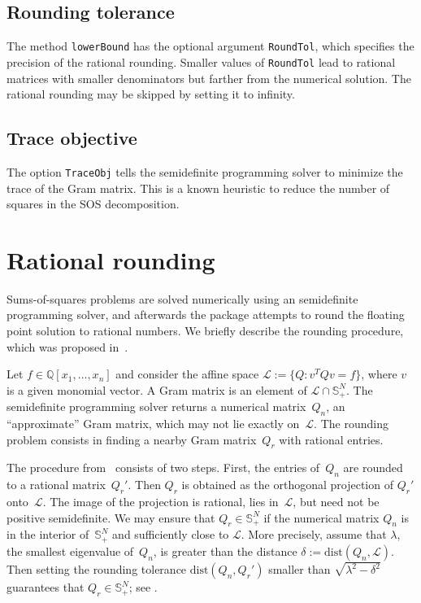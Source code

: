 \documentclass[11pt]{amsart}
\theoremstyle{plain}%
\theoremstyle{definition}
\theoremstyle{remark}
\newcommand{\QQ}{\mathbb{Q}}
\begin{document}
\subsection*{Rounding tolerance}
The method \verb|lowerBound| has the optional argument \verb|RoundTol|, which specifies the precision of the rational rounding.
Smaller values of \verb|RoundTol| lead to rational matrices with smaller denominators but farther from the numerical solution.
The rational rounding may be skipped by setting it to infinity.

\subsection*{Trace objective}
The option \verb|TraceObj| tells the semidefinite programming solver to minimize the trace of the Gram matrix.
This is a known heuristic to reduce the number of squares in the SOS decomposition.

\appendix

\section{Rational rounding}%
\label{sec:rounding}

Sums-of-squares problems are solved numerically using an semidefinite programming solver,
and afterwards the package attempts to round the floating point solution to rational numbers.
We briefly describe the rounding procedure, which was proposed in~\cite{peyrl2008computing}.

Let $f\in \QQ[x_1,\dots,x_n]$ and consider the affine space $\mathcal{L}:= \{Q: v^T\! Q v \!=\! f\}$, where $v$ is a given monomial vector.
A Gram matrix is an element of $\mathcal{L}\cap \mathbb{S}_+^N$.
The semidefinite programming solver returns a numerical matrix~$Q_n$, an ``approximate'' Gram matrix, which may not lie exactly on~$\mathcal{L}$.
The rounding problem consists in finding a nearby Gram matrix~$Q_r$ with rational entries.

The procedure from~\cite{peyrl2008computing} consists of two steps.
First, the entries of~$Q_n$ are rounded to a rational matrix~$Q_r'$.
Then $Q_r$ is obtained as the orthogonal projection of $Q_r'$ onto~$\mathcal{L}$.
The image of the projection is rational, lies in~$\mathcal{L}$, but need not be positive semidefinite.
We may ensure that $Q_r\in \mathbb{S}_+^N$ if the numerical matrix $Q_n$ is in the interior of~$\mathbb{S}_+^N$ and sufficiently close to $\mathcal{L}$.
More precisely, assume that $\lambda$, the smallest eigenvalue of~$Q_n$, is greater than the distance $\delta:= \textrm{dist}(Q_n,\mathcal{L})$.
Then setting the {rounding tolerance} $\textrm{dist}(Q_n,Q_r')$ smaller than $\sqrt{\lambda^2 - \delta^2}$ guarantees that $Q_r \in \mathbb{S}_+^N$; 
see \cite[Prop.~8]{peyrl2008computing}.
\end{document}
